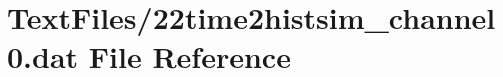 \hypertarget{22time2histsim__channel0_8dat}{}\section{Text\+Files/22time2histsim\+\_\+channel0.dat File Reference}
\label{22time2histsim__channel0_8dat}
